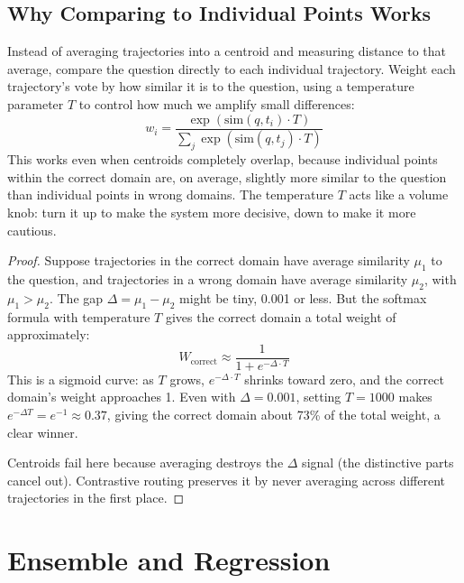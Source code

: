 \documentclass[11pt]{article}
\begin{document}
\subsection{Why Comparing to Individual Points Works}

\begin{theorem}\label{thm:contrastive}
Instead of averaging trajectories into a centroid and measuring distance
to that average, compare the question directly to each individual trajectory.
Weight each trajectory's vote by how similar it is to the question, using a
temperature parameter $T$ to control how much we amplify small differences:
\begin{equation}
w_i = \frac{\exp(\text{sim}(q, t_i) \cdot T)}{\sum_j \exp(\text{sim}(q, t_j) \cdot T)}
\end{equation}
This works even when centroids completely overlap, because individual points
within the correct domain are, on average, slightly more similar to the
question than individual points in wrong domains. The temperature $T$ acts
like a volume knob: turn it up to make the system more decisive, down to
make it more cautious.
\end{theorem}
\begin{proof}
Suppose trajectories in the correct domain have average similarity $\mu_1$ to
the question, and trajectories in a wrong domain have average similarity
$\mu_2$, with $\mu_1 > \mu_2$. The gap $\Delta = \mu_1 - \mu_2$ might be
tiny, 0.001 or less. But the softmax formula with temperature $T$ gives the
correct domain a total weight of approximately:
\begin{equation}
W_{\text{correct}} \approx \frac{1}{1 + e^{-\Delta \cdot T}}
\end{equation}
This is a sigmoid curve: as $T$ grows, $e^{-\Delta \cdot T}$ shrinks toward
zero, and the correct domain's weight approaches 1. Even with $\Delta =
0.001$, setting $T = 1000$ makes $e^{-\Delta T} = e^{-1} \approx 0.37$,
giving the correct domain about 73\% of the total weight, a clear winner.

Centroids fail here because averaging destroys the $\Delta$ signal (the
distinctive parts cancel out). Contrastive routing preserves it by never
averaging across different trajectories in the first place.
\end{proof}


\section{Ensemble and Regression}
\end{document}
